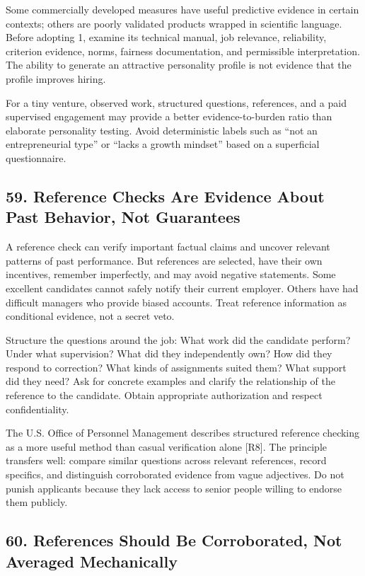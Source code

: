 Some commercially developed measures have useful predictive evidence in certain contexts; others are poorly validated products wrapped in scientific language. Before adopting 1, examine its technical manual, job relevance, reliability, criterion evidence, norms, fairness documentation, and permissible interpretation. The ability to generate an attractive personality profile is not evidence that the profile improves hiring.

For a tiny venture, observed work, structured questions, references, and a paid supervised engagement may provide a better evidence-to-burden ratio than elaborate personality testing. Avoid deterministic labels such as ``not an entrepreneurial type'' or ``lacks a growth mindset'' based on a superficial questionnaire.

\subsection*{59. Reference Checks Are Evidence About Past Behavior, Not Guarantees}

A reference check can verify important factual claims and uncover relevant patterns of past performance. But references are selected, have their own incentives, remember imperfectly, and may avoid negative statements. Some excellent candidates cannot safely notify their current employer. Others have had difficult managers who provide biased accounts. Treat reference information as conditional evidence, not a secret veto.

Structure the questions around the job: What work did the candidate perform? Under what supervision? What did they independently own? How did they respond to correction? What kinds of assignments suited them? What support did they need? Ask for concrete examples and clarify the relationship of the reference to the candidate. Obtain appropriate authorization and respect confidentiality.

The U.S. Office of Personnel Management describes structured reference checking as a more useful method than casual verification alone [R8]. The principle transfers well: compare similar questions across relevant references, record specifics, and distinguish corroborated evidence from vague adjectives. Do not punish applicants because they lack access to senior people willing to endorse them publicly.

\subsection*{60. References Should Be Corroborated, Not Averaged Mechanically}

